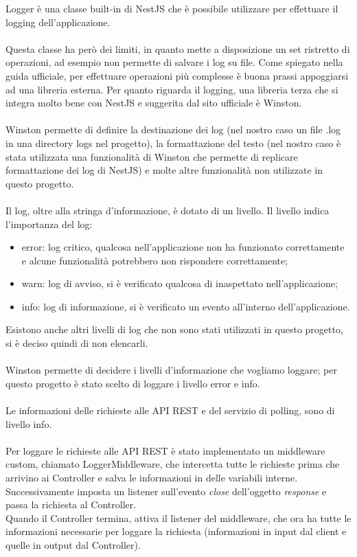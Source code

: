 \leavevmode\newline
Logger è una classe built-in di NestJS che è possibile utilizzare per effettuare il logging 
dell'applicazione. 
\\\\
Questa classe ha però dei limiti, in quanto mette a disposizione un set ristretto di operazioni, ad esempio 
non permette di salvare i log su file. Come spiegato nella 
guida ufficiale, per effettuare operazioni più complesse è buona prassi appoggiarsi ad una libreria
esterna. Per quanto riguarda il logging, una libreria terza che si integra molto bene con NestJS e suggerita dal sito ufficiale è
Winston.
\\\\
Winston permette di definire la destinazione dei log (nel nostro caso un file .log in una directory logs nel
progetto), la formattazione del testo (nel nostro caso è stata utilizzata una funzionalità di Winston che permette
di replicare formattazione dei log di NestJS) e molte altre funzionalità non utilizzate
in questo progetto.
\\\\
Il log, oltre alla stringa d'informazione, è dotato di un livello.
Il livello 
indica l'importanza del log:
\begin{itemize}
    \item error: log critico, qualcosa nell'applicazione non ha funzionato correttamente e
        alcune funzionalità potrebbero non rispondere correttamente;
    \item warn: log di avviso, si è verificato qualcosa di inaspettato nell'applicazione;
    \item info: log di informazione, si è verificato un evento all'interno dell'applicazione.
\end{itemize}
\leavevmode\newline
Esistono anche altri livelli di log che non sono stati utilizzati in questo progetto, si è deciso quindi di non elencarli.
\\\\
Winston permette di decidere i livelli d'informazione che vogliamo loggare; per questo progetto è stato scelto di loggare
i livello error e info.
\\\\
Le informazioni delle richieste alle \gls{API} \gls{REST} e del servizio di polling, sono di livello info.
\\\\
Per loggare le richieste alle \gls{API} \gls{REST} è stato implementato un middleware custom, chiamato LoggerMiddleware, che intercetta tutte le 
richieste prima che arrivino ai Controller e salva le informazioni in delle variabili interne.
\\
Successivamente imposta un listener sull'evento \textit{close} dell'oggetto \textit{response} e passa la richiesta al Controller.
\\
Quando il Controller termina, attiva il listener del middleware, che ora ha tutte le informazioni necessarie per loggare la richiesta 
(informazioni in input dal client e quelle in output dal Controller).

